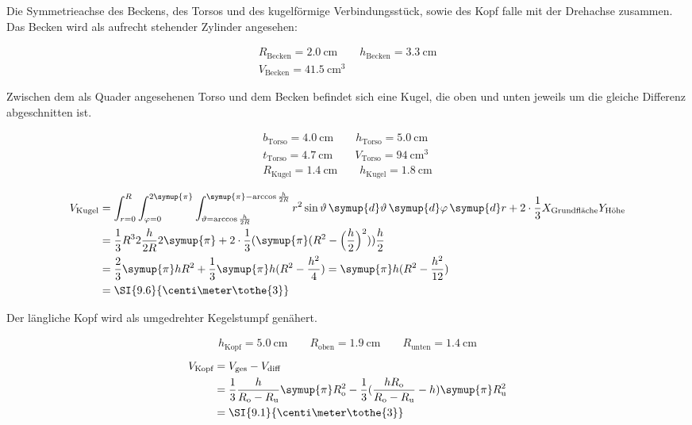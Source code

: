 Die Symmetrieachse des Beckens, des Torsos und des kugelförmige Verbindungsstück, sowie des Kopf falle mit der Drehachse 
zusammen. 
Das Becken wird als aufrecht stehender Zylinder angesehen:

\begin{gather}
    R_\text{Becken}=\SI{2.0}{\centi\meter} \quad \quad 
    h_\text{Becken}=\SI{3.3}{\centi\meter} \\
    V_\text{Becken}=\SI{41.5}{\centi\meter\tothe{3}}
\end{gather}

Zwischen dem als Quader angesehenen Torso und dem Becken befindet sich eine Kugel, die oben und unten jeweils um die 
gleiche Differenz abgeschnitten ist. 

\begin{gather}
    b_\text{Torso}=\SI{4.0}{\centi\meter} \quad \quad 
    h_\text{Torso}=\SI{5.0}{\centi\meter} \\
    t_\text{Torso}=\SI{4.7}{\centi\meter} \quad \quad 
    V_\text{Torso}=\SI{94}{\centi\meter\tothe{3}} \\
    R_\text{Kugel}=\SI{1.4}{\centi\meter} \quad \quad 
    h_\text{Kugel}=\SI{1.8}{\centi\meter} \\
\end{gather}
\begin{align}
    V_\text{Kugel}&=\int_{r=0}^R \int_{\varphi=0}^{2\symup{\pi}} \int_{\vartheta=\arccos{\frac{h}{2R}}}^{\symup{\pi}-\arccos{\frac{h}{2R}}} 
        r^2\sin{\vartheta} \, \symup{d}\vartheta \, \symup{d}\varphi \, \symup{d}r 
        + 2\cdot\frac{1}{3} X_\text{Grundfläche} Y_\text{Höhe} \\
        &= \frac{1}{3}R^3 2\frac{h}{2R} 2\symup{\pi} 
            + 2\cdot\frac{1}{3} (\symup{\pi} (R^2-\Bigl(\frac{h}{2}\Bigr)^2)) \frac{h}{2} \\
        &= \frac{2}{3}\symup{\pi}hR^2 + \frac{1}{3}\symup{\pi}h(R^2-\frac{h^2}{4}) = \symup{\pi}h(R^2-\frac{h^2}{12}) \\
        &= \SI{9.6}{\centi\meter\tothe{3}}
\end{align}

Der längliche Kopf wird als umgedrehter Kegelstumpf genähert. 

\begin{gather}
    h_\text{Kopf}=\SI{5.0}{\centi\meter} \quad \quad
    R_\text{oben}=\SI{1.9}{\centi\meter} \quad \quad 
    R_\text{unten}=\SI{1.4}{\centi\meter} 
\end{gather}
\begin{align}
    V_\text{Kopf}&=V_\text{ges}-V_\text{diff} \\
        &= \frac{1}{3} \frac{h}{R_\text{o}-R_\text{u}} \symup{\pi} R_\text{o}^2 - \frac{1}{3}(\frac{hR_\text{o}}{R_\text{o}-R_\text{u}}-h)\symup{\pi}R_\text{u}^2 \\
        &= \SI{9.1}{\centi\meter\tothe{3}}
\end{align}

